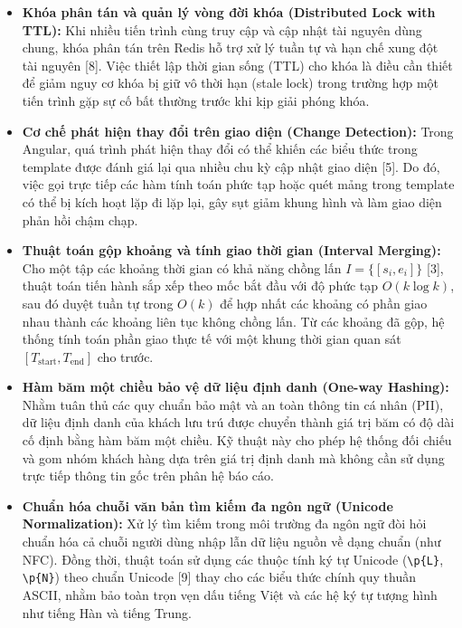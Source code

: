 \begin{itemize}[leftmargin=1.2cm, itemsep=3pt, topsep=3pt]
\item \textbf{Khóa phân tán và quản lý vòng đời khóa (Distributed Lock with TTL):} Khi nhiều tiến trình cùng truy cập và cập nhật tài nguyên dùng chung, khóa phân tán trên Redis hỗ trợ xử lý tuần tự và hạn chế xung đột tài nguyên [8]. Việc thiết lập thời gian sống (TTL) cho khóa là điều cần thiết để giảm nguy cơ khóa bị giữ vô thời hạn (stale lock) trong trường hợp một tiến trình gặp sự cố bất thường trước khi kịp giải phóng khóa.

\item \textbf{Cơ chế phát hiện thay đổi trên giao diện (Change Detection):} Trong Angular, quá trình phát hiện thay đổi có thể khiến các biểu thức trong template được đánh giá lại qua nhiều chu kỳ cập nhật giao diện [5]. Do đó, việc gọi trực tiếp các hàm tính toán phức tạp hoặc quét mảng trong template có thể bị kích hoạt lặp đi lặp lại, gây sụt giảm khung hình và làm giao diện phản hồi chậm chạp.

\item \textbf{Thuật toán gộp khoảng và tính giao thời gian (Interval Merging):} Cho một tập các khoảng thời gian có khả năng chồng lấn $I = \{[s_i, e_i]\}$ [3], thuật toán tiến hành sắp xếp theo mốc bắt đầu với độ phức tạp $O(k \log k)$, sau đó duyệt tuần tự trong $O(k)$ để hợp nhất các khoảng có phần giao nhau thành các khoảng liên tục không chồng lấn. Từ các khoảng đã gộp, hệ thống tính toán phần giao thực tế với một khung thời gian quan sát $[T_{\text{start}}, T_{\text{end}}]$ cho trước.

\item \textbf{Hàm băm một chiều bảo vệ dữ liệu định danh (One-way Hashing):} Nhằm tuân thủ các quy chuẩn bảo mật và an toàn thông tin cá nhân (PII), dữ liệu định danh của khách lưu trú được chuyển thành giá trị băm có độ dài cố định bằng hàm băm một chiều. Kỹ thuật này cho phép hệ thống đối chiếu và gom nhóm khách hàng dựa trên giá trị định danh mà không cần sử dụng trực tiếp thông tin gốc trên phân hệ báo cáo.

\item \textbf{Chuẩn hóa chuỗi văn bản tìm kiếm đa ngôn ngữ (Unicode Normalization):} Xử lý tìm kiếm trong môi trường đa ngôn ngữ đòi hỏi chuẩn hóa cả chuỗi người dùng nhập lẫn dữ liệu nguồn về dạng chuẩn (như NFC). Đồng thời, thuật toán sử dụng các thuộc tính ký tự Unicode (\texttt{\textbackslash p\{L\}}, \texttt{\textbackslash p\{N\}}) theo chuẩn Unicode [9] thay cho các biểu thức chính quy thuần ASCII, nhằm bảo toàn trọn vẹn dấu tiếng Việt và các hệ ký tự tượng hình như tiếng Hàn và tiếng Trung.
\end{itemize}

